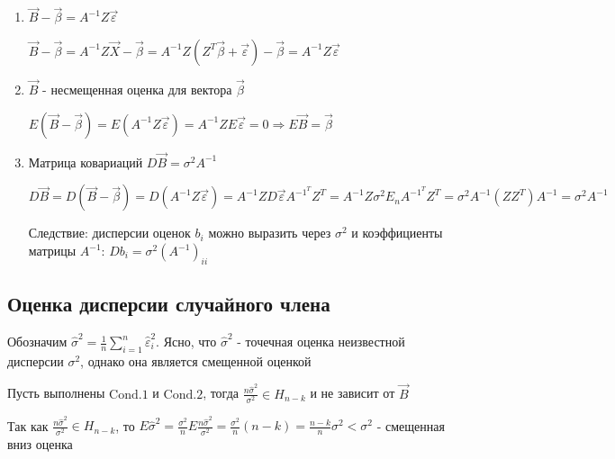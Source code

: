 \documentclass[12pt]{article}
\begin{document}
\begin{enumerate}
    \item $\vec B - \vec \beta = A^{-1} Z \vec \varepsilon$

    \begin{MyProof}
        $\vec B - \vec \beta = A^{-1} Z \vec X - \vec \beta = A^{-1} Z (Z^T \vec \beta + \vec \varepsilon) - \vec \beta = A^{-1} Z \vec \varepsilon$
    \end{MyProof}

    \item $\vec B$ - несмещенная оценка для вектора $\vec \beta$

    \begin{MyProof}
        $E(\vec B - \vec \beta) = E(A^{-1} Z \vec \varepsilon) = A^{-1} Z E \vec \varepsilon = 0 \Longrightarrow E \vec B = \vec \beta$
    \end{MyProof}

    \item Матрица ковариаций $D \vec B = \sigma^2 A^{-1}$

    \begin{MyProof}
        $D \vec B = D (\vec B - \vec \beta) = D (A^{-1} Z \vec \varepsilon) = A^{-1} Z D \vec \varepsilon A^{-1}^T Z^T = A^{-1} Z \sigma^2 E_n A^{-1}^T Z^T = \sigma^2 A^{-1} (Z Z^T) A^{-1} = \sigma^2 A^{-1}$
    \end{MyProof}

    Следствие: дисперсии оценок $b_i$ можно выразить через $\sigma^2$ и коэффициенты матрицы $A^{-1}$: $D b_i = \sigma^2 (A^{-1})_{ii}$

\end{enumerate}

\subsection{Оценка дисперсии случайного члена}

Обозначим $\hat \sigma^2 = \frac{1}{n} \sum_{i = 1}^n \hat \varepsilon^2_i$. Ясно, что $\hat \sigma^2$ - точечная оценка 
неизвестной дисперсии $\sigma^2$, однако она является смещенной оценкой

\begin{MyTheorem}
    Пусть выполнены $\mathrm{Cond. 1}$ и $\mathrm{Cond. 2}$, тогда $\frac{n \hat \sigma^2}{\sigma^2} \in H_{n - k}$ и не зависит от $\vec B$
\end{MyTheorem}

Так как $\frac{n \hat \sigma^2}{\sigma^2} \in H_{n - k}$, то $E \hat \sigma^2 = \frac{\sigma^2}{n} E \frac{n \hat \sigma^2}{\sigma^2} = \frac{\sigma^2}{n} (n - k) = \frac{n - k}{n} \sigma^2 < \sigma^2$ - смещенная вниз оценка
\end{document}
